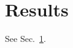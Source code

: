 \documentclass{article}
\begin{document}
\section{Results}\label{sec:r} See Sec.~\ref{sec:r}.
\end{document}
